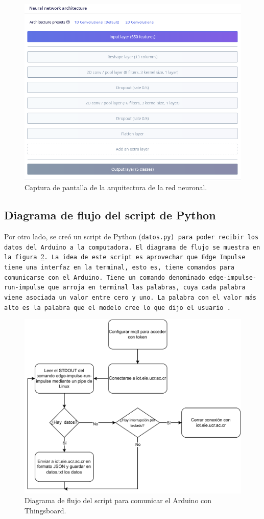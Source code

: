 \begin{figure}
    \centering
    \includegraphics[width=12cm]{Imagenes/neural-2.png}
    \caption{Captura de pantalla de la arquitectura de la red neuronal.}
    \label{neural-2}
\end{figure}

\subsection{Diagrama de flujo del script de Python}
Por otro lado, se creó un script de Python (\tt{datos.py}) para poder recibir los datos del Arduino a la computadora. El diagrama de flujo se muestra en la figura \ref{py-diag}. La idea de este script es aprovechar que Edge Impulse tiene una interfaz en la terminal, esto es, tiene comandos para comunicarse con el Arduino. Tiene un comando denominado \tt{edge-impulse-run-impulse} que arroja en terminal las palabras, cuya cada palabra viene asociada un valor entre cero y uno. La palabra con el valor más alto es la palabra que el modelo cree lo que dijo el usuario \cite{edge-cli}.

\begin{figure}[th]
    \centering
    \includegraphics[width=13cm]{Imagenes/py.pdf}
    \caption{Diagrama de flujo del script para comunicar el Arduino con Thingsboard.}
    \label{py-diag}
\end{figure}

